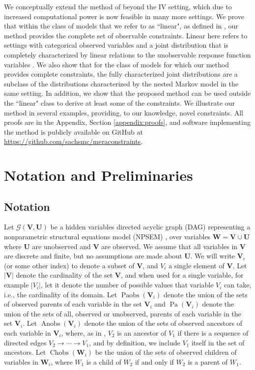 \documentclass[12pt]{article}
\DeclareMathOperator{\Anobs}{Anobs}
\DeclareMathOperator{\Paobs}{Paobs}
\DeclareMathOperator{\Chobs}{Chobs}
\newcommand{\bW}{\boldsymbol{W}}
\newcommand{\bU}{\boldsymbol{U}}
\newcommand{\bV}{\boldsymbol{V}}
\DeclareMathOperator{\Pa}{Pa}
\begin{document}
We conceptually extend the method of \citet{bonet2001instrumentality} beyond the IV setting, which due to increased computational power is now feasible in many more settings. We prove that within the class of models that we refer to as ``linear", as defined in \citet{duarte2023automated}, our method provides the complete set of observable constraints. Linear here refers to settings with categorical observed variables and a joint distribution that is completely characterized by linear relations to the unobservable response function variables \citep{balke1994counterfactual, sachs2023general}. We also show that for the class of models for which our method provides complete constraints, the fully characterized joint distributions are a subclass of the distributions characterized by the nested Markov model in the same setting. In addition, we show that the proposed method can be used outside the ``linear" class to derive at least some of the constraints. We illustrate our method in several examples, providing, to our knowledge, novel constraints. All proofs are in the Appendix, Section \ref{appendix:proofs}, and software implementing the method is publicly available on GitHub at \url{https://github.com/sachsmc/meraconstraints}.



\section{Notation and Preliminaries}
\subsection{Notation}
Let $\mathcal{G}(\bV, \bU)$ be a hidden variables directed acyclic graph (DAG) representing a nonparametric structural equations model (NPSEM) \citep{Pearl2000causality}, over variables $\bW = \bV \cup \bU$ where $\bU$ are unobserved and $\bV$ are observed. We assume that all variables in $\bV$ are discrete and finite, but no assumptions are made about $\bU$. We will write $\bV_i$ (or some other index) to denote a subset of $\bV$, and $V_i$ a single element of $\bV$. Let $|\bV|$ denote the cardinality of the set $\bV$, and when used for a single variable, for example $|V_i|$, let it denote the number of possible values that variable $V_i$ can take, i.e., the cardinality of its domain. Let $\Paobs(\bV_i)$ denote the union of the sets of observed parents of each variable in the set $\bV_i$ and $\Pa(\bV_i)$ denote the union of the sets of all, observed or unobserved, parents of each variable in the set $\bV_i$. Let $\Anobs(\bV_i)$ denote the union of the sets of observed ancestors of each variable in $\bV_i$, where, as in \citet{evans2019smooth}, $V_2$ is an ancestor of $V_1$ if there is a sequence of directed edges $V_2 \rightarrow \cdots \rightarrow V_1$, and by definition, we include $V_1$ itself in the set of ancestors. Let $\Chobs(\bW_i)$ be the union of the sets of observed children of variables in $\bW_i$, where $W_1$ is a child of $W_2$ if and only if $W_2$ is a parent of $W_1$. 
\end{document}
